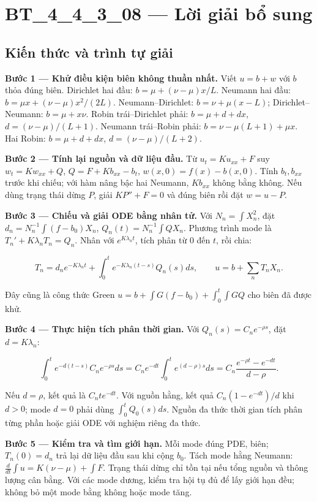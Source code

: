 \documentclass[10pt,a4paper]{article}
\begin{document}
\section*{BT\_4\_4\_3\_08 — Lời giải bổ sung}
\subsection*{Kiến thức và trình tự giải}
\textbf{Bước 1 — Khử điều kiện biên không thuần nhất.} Viết $u=b+w$ với $b$ thỏa đúng biên. Dirichlet hai đầu: $b=\mu+(\nu-\mu)x/L$. Neumann hai đầu: $b=\mu x+(\nu-\mu)x^2/(2L)$. Neumann–Dirichlet: $b=\nu+\mu(x-L)$; Dirichlet–Neumann: $b=\mu+x\nu$. Robin trái–Dirichlet phải: $b=\mu+d+dx$, $d=(\nu-\mu)/(L+1)$. Neumann trái–Robin phải: $b=\nu-\mu(L+1)+\mu x$. Hai Robin: $b=\mu+d+dx$, $d=(\nu-\mu)/(L+2)$.

\textbf{Bước 2 — Tính lại nguồn và dữ liệu đầu.} Từ $u_t=Ku_{xx}+F$ suy $w_t=Kw_{xx}+Q$, $Q=F+Kb_{xx}-b_t$, $w(x,0)=f(x)-b(x,0)$. Tính $b_t,b_{xx}$ trước khi chiếu; với hàm nâng bậc hai Neumann, $Kb_{xx}$ không bằng không. Nếu dùng trạng thái dừng $P$, giải $KP''+F=0$ và đúng biên rồi đặt $w=u-P$.

\textbf{Bước 3 — Chiếu và giải ODE bằng nhân tử.} Với $N_n=\int X_n^2$, đặt $d_n=N_n^{-1}\int(f-b_0)X_n$, $Q_n(t)=N_n^{-1}\int QX_n$. Phương trình mode là $T_n'+K\lambda_nT_n=Q_n$. Nhân với $e^{K\lambda_nt}$, tích phân từ $0$ đến $t$, rồi chia:


\[
T_n=d_ne^{-K\lambda_nt}+\int_0^te^{-K\lambda_n(t-s)}Q_n(s)ds,\qquad
u=b+\sum_nT_nX_n.
\]


Đây cũng là công thức Green $u=b+\int G(f-b_0)+\int_0^t\int GQ$ cho biên đã được khử.

\textbf{Bước 4 — Thực hiện tích phân thời gian.} Với $Q_n(s)=C_ne^{-\rho s}$, đặt $d=K\lambda_n$:


\[
\int_0^te^{-d(t-s)}C_ne^{-\rho s}ds
=C_ne^{-dt}\int_0^te^{(d-\rho)s}ds
=C_n\frac{e^{-\rho t}-e^{-dt}}{d-\rho}.
\]


Nếu $d=\rho$, kết quả là $C_nte^{-dt}$. Với nguồn hằng, kết quả $C_n(1-e^{-dt})/d$ khi $d>0$; mode $d=0$ phải dùng $\int_0^tQ_0(s)ds$. Nguồn đa thức thời gian tích phân từng phần hoặc giải ODE với nghiệm riêng đa thức.

\textbf{Bước 5 — Kiểm tra và tìm giới hạn.} Mỗi mode đúng PDE, biên; $T_n(0)=d_n$ trả lại dữ liệu đầu sau khi cộng $b_0$. Tách mode hằng Neumann: $\frac d{dt}\int u=K(\nu-\mu)+\int F$. Trạng thái dừng chỉ tồn tại nếu tổng nguồn và thông lượng cân bằng. Với các mode dương, kiểm tra hội tụ đủ để lấy giới hạn đều; không bỏ một mode bằng không hoặc mode tăng.
\end{document}
